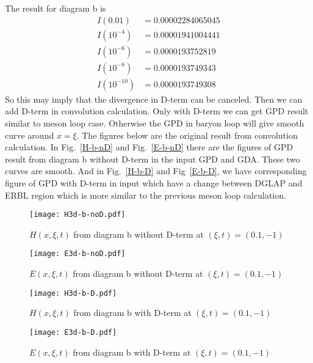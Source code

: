 \documentclass[preprintnumbers,prd,superscriptaddress,preprint]{revtex4-1}
\begin{document}
	The result for diagram b is 
	\begin{align*}
		I(0.01) & =0.00002284065045\\
		I(10^{-4}) & =0.00001941004441\\
		I(10^{-6}) & =0.0000193752819\\
		I(10^{-8}) & =0.0000193749343\\
		I(10^{-10}) & =0.0000193749308
	\end{align*}
	So this may imply that the divergence in D-term can be canceled. Then we can add D-term in convolution calculation. 
	Only with D-term we can get GPD result similar to meson loop case. Otherwise the GPD in baryon loop will give smooth curve around $x=\xi$. The figures below are the original result from convolution calculation. In Fig.~\ref{H-b-nD} and Fig.~\ref{E-b-nD} there are the figures of GPD result from diagram b without D-term in the input GPD and GDA. These two curves are smooth.
	And in Fig.~\ref{H-b-D} and Fig~\ref{E-b-D}, we have corresponding figure of GPD with D-term in input which have a change between DGLAP and ERBL region which is more similar to the previous meson loop calculation.
	\begin{figure}[h]
		\begin{center}
			\texttt{[image: H3d-b-noD.pdf]}
			\caption{$H(x,\xi,t)$ from diagram b without D-term at $(\xi,t)=(0.1,-1)$} 
			\label{H-b-nD-3d}
		\end{center}
	\end{figure}
	
	\begin{figure}[h]
		\begin{center}
			\texttt{[image: E3d-b-noD.pdf]}
			\caption{$E(x,\xi,t)$ from diagram b without D-term at $(\xi,t)=(0.1,-1)$} 
			\label{E-b-nD-3d}
		\end{center}
	\end{figure}
	
	\begin{figure}[h]
		\begin{center}
			\texttt{[image: H3d-b-D.pdf]}
			\caption{$H(x,\xi,t)$ from diagram b with D-term at $(\xi,t)=(0.1,-1)$} 
			\label{H-b-D-3d}
		\end{center}
	\end{figure}
	
	\begin{figure}[h]
		\begin{center}
			\texttt{[image: E3d-b-D.pdf]}
			\caption{$E(x,\xi,t)$ from diagram b with D-term at $(\xi,t)=(0.1,-1)$} 
			\label{E-b-D-3d}
		\end{center}
	\end{figure}
	
\end{document}
